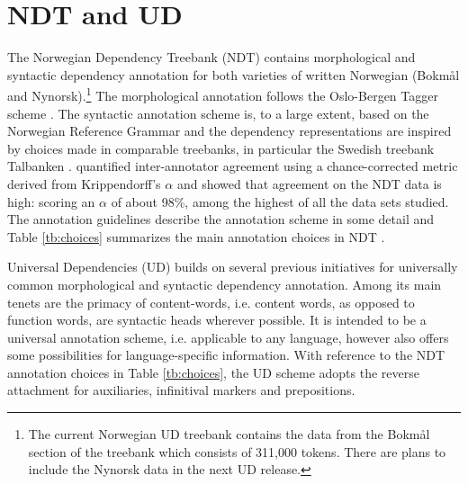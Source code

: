 \documentclass[10pt, a4paper]{article}
\begin{document}
\section{NDT and UD}
The Norwegian Dependency Treebank (NDT) \cite{Sol:Skj:Ovr:14} contains
morphological and syntactic dependency annotation for both varieties
of written Norwegian (Bokm{\aa}l and Nynorsk).\footnote{The current
  Norwegian UD treebank contains the data from the Bokmål section of
  the treebank which consists of 311,000 tokens. There are plans to
  include the Nynorsk data in the next UD release.} The morphological
annotation follows the Oslo-Bergen Tagger scheme
\cite{Hag:Joh:Nok:00}.  The syntactic annotation scheme is, to a large
extent, based on the Norwegian Reference Grammar
\cite{Faa:Lie:Van:97} and the dependency representations are
inspired by choices made in comparable treebanks, in particular the
Swedish treebank Talbanken \cite{Niv:Nil:Hal:2006}.
 quantified inter-annotator agreement using a chance-corrected metric derived from
Krippendorff's $\alpha$ and showed that agreement on the NDT data is high: scoring an $\alpha$ of about
98\%, among the highest of all the data sets studied.
The annotation guidelines \cite{Kin:Sol:Eri:2013} describe the annotation scheme in some detail and Table \ref{tb:choices} summarizes the main annotation choices in NDT \cite{Sol:Skj:Ovr:14}.


Universal Dependencies (UD) builds on several previous initiatives for
universally common morphological \cite{Zem:08,Pet:Das:McD:12} and
syntactic dependency \cite{McD:Niv:Qui:13,Ros:Mas:Mar:14}
annotation. Among its main tenets are the primacy of content-words,
i.e. content words, as opposed to function words, are syntactic heads
wherever possible. It is intended to be a universal annotation scheme,
i.e. applicable to any language, however also offers some
possibilities for language-specific information. With reference to the
NDT annotation choices in Table \ref{tb:choices}, the UD scheme adopts
the reverse attachment for auxiliaries, infinitival markers and
prepositions.
\end{document}

